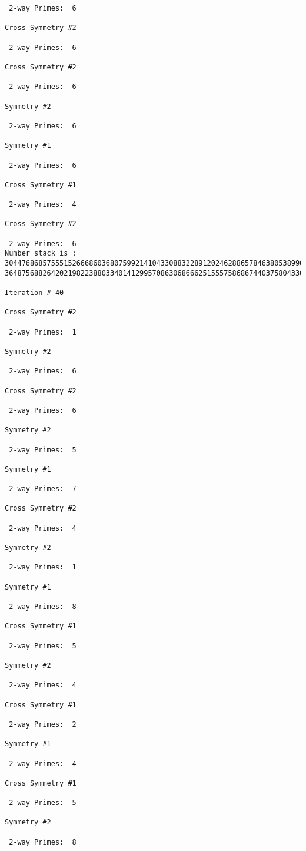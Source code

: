 \begin{verbatim}
 2-way Primes: 	6

Cross Symmetry #2

 2-way Primes: 	6

Cross Symmetry #2

 2-way Primes: 	6

Symmetry #2

 2-way Primes: 	6

Symmetry #1

 2-way Primes: 	6

Cross Symmetry #1

 2-way Primes: 	4

Cross Symmetry #2

 2-way Primes: 	6
Number stack is :
30447686857555152666860368075992141043308832289120246288657846380538996794608835958544046240163340857
36487568826420219822388033401412995708630686662515557586867440375804336104264044585953880649769983508

Iteration #	40

Cross Symmetry #2

 2-way Primes: 	1

Symmetry #2

 2-way Primes: 	6

Cross Symmetry #2

 2-way Primes: 	6

Symmetry #2

 2-way Primes: 	5

Symmetry #1

 2-way Primes: 	7

Cross Symmetry #2

 2-way Primes: 	4

Symmetry #2

 2-way Primes: 	1

Symmetry #1

 2-way Primes: 	8

Cross Symmetry #1

 2-way Primes: 	5

Symmetry #2

 2-way Primes: 	4

Cross Symmetry #1

 2-way Primes: 	2

Symmetry #1

 2-way Primes: 	4

Cross Symmetry #1

 2-way Primes: 	5

Symmetry #2

 2-way Primes: 	8


\end{verbatim}
